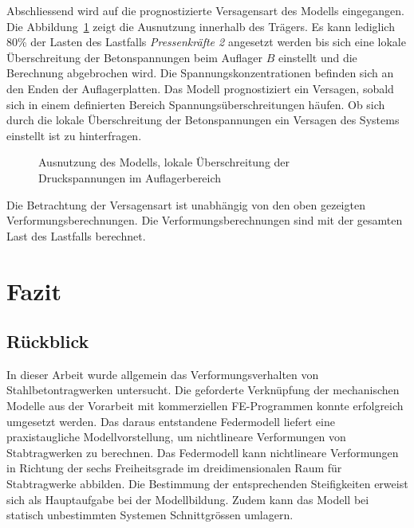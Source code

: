 \documentclass[
  11pt,
  letterpaper,
]{scrreprt}
\begin{document}
Abschliessend wird auf die prognostizierte Versagensart des Modells
eingegangen. Die Abbildung~\ref{fig-versagen_ideastat} zeigt die
Ausnutzung innerhalb des Trägers. Es kann lediglich 80\% der Lasten des
Lastfalls \emph{Pressenkräfte 2} angesetzt werden bis sich eine lokale
Überschreitung der Betonspannungen beim Auflager \(B\) einstellt und die
Berechnung abgebrochen wird. Die Spannungskonzentrationen befinden sich
an den Enden der Auflagerplatten. Das Modell prognostiziert ein
Versagen, sobald sich in einem definierten Bereich
Spannungsüberschreitungen häufen. Ob sich durch die lokale
Überschreitung der Betonspannungen ein Versagen des Systems einstellt
ist zu hinterfragen.

\begin{figure}[H]


\caption{\label{fig-versagen_ideastat}Ausnutzung des Modells, lokale
Überschreitung der Druckspannungen im Auflagerbereich}

\end{figure}%

Die Betrachtung der Versagensart ist unabhängig von den oben gezeigten
Verformungsberechnungen. Die Verformungsberechnungen sind mit der
gesamten Last des Lastfalls berechnet.


\chapter{Fazit}\label{fazit}

\section{Rückblick}\label{ruxfcckblick}

In dieser Arbeit wurde allgemein das Verformungsverhalten von
Stahlbetontragwerken untersucht. Die geforderte Verknüpfung der
mechanischen Modelle aus der Vorarbeit mit kommerziellen FE-Programmen
konnte erfolgreich umgesetzt werden. Das daraus entstandene Federmodell
liefert eine praxistaugliche Modellvorstellung, um nichtlineare
Verformungen von Stabtragwerken zu berechnen. Das Federmodell kann
nichtlineare Verformungen in Richtung der sechs Freiheitsgrade im
dreidimensionalen Raum für Stabtragwerke abbilden. Die Bestimmung der
entsprechenden Steifigkeiten erweist sich als Hauptaufgabe bei der
Modellbildung. Zudem kann das Modell bei statisch unbestimmten Systemen
Schnittgrössen umlagern.
\end{document}
